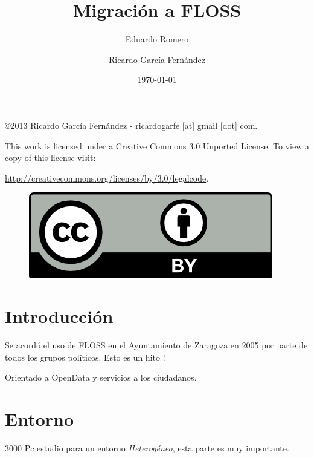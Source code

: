 \documentclass[11pt]{scrartcl}
\title{\textbf{Migraci\'on a FLOSS}}
\subtitle{Eduardo Romero}
\author{Ricardo Garc\'ia Fern\'andez}
\date{\today}
\begin{document}
\maketitle

\vfill

\begin{flushright}
    \copyright  2013 Ricardo Garc\'ia Fern\'andez - ricardogarfe [at] gmail [dot] com.

    This work is licensed under a Creative Commons 3.0 Unported License.
    To view a copy of this license visit:
 
    \url{http://creativecommons.org/licenses/by/3.0/legalcode}.
\end{flushright}

\begin{figure}[h]
    \begin{flushright}	
        \includegraphics{by}
        \label{fig:by}
    \end{flushright}
\end{figure}

\newpage

\section{Introducci\'on}
\label{sec:introduction}

\par Se acord\'o el uso de FLOSS en el Ayuntamiento de Zaragoza en 2005 por parte de todos los grupos pol\'iticos. Esto es un hito !

\par Orientado a OpenData y servicios a los ciudadanos.


\section{Entorno}
\label{sec:entorno}

\par 3000 Pc estudio para un entorno \emph{Heterog\'eneo}, esta parte es muy importante.
\end{document}
